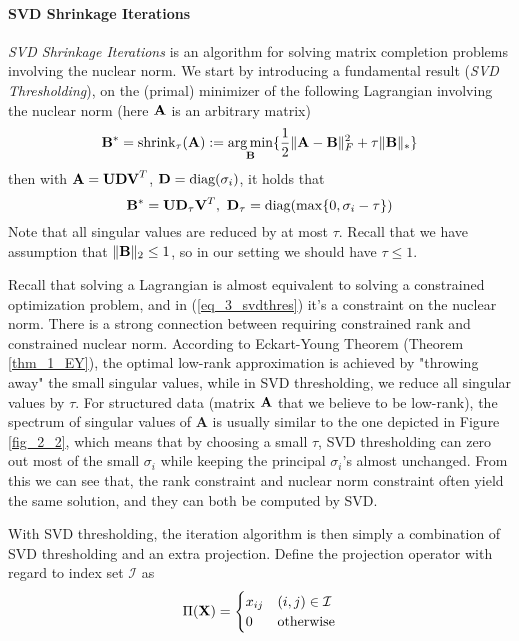 \documentclass[../book-template.tex]{subfiles}
\begin{document}
\paragraph{SVD Shrinkage Iterations}
\par \emph{SVD Shrinkage Iterations} is an algorithm for solving matrix completion problems involving the nuclear norm. We start by introducing a fundamental result (\emph{SVD Thresholding}), on the (primal) minimizer of the following Lagrangian involving the nuclear norm (here ${\bf A}$ is an arbitrary matrix)
\begin{equation}\label{eq_3_svdthres}
	{\bf B}^*=\text{shrink}_{\tau}({\bf A}):=\mathop{\arg\min}_{{\bf B}}\{\frac{1}{2}\|{\bf A}-{\bf B}\|^2_F+\tau\|{\bf B}\|_*\}
\end{equation}
then with ${\bf A}={\bf UDV}^T$, ${\bf D}=\text{diag}(\sigma_i)$, it holds that
\begin{equation*}
	{\bf B}^* = {\bf UD}_{\tau}{\bf V}^T,\ {\bf D}_{\tau}=\text{diag}(\max\{0, \sigma_i-\tau\})
\end{equation*}
Note that all singular values are reduced by at most $\tau$. Recall that we have assumption that $\|{\bf B}\|_2\leq 1$, so in our setting we should have $\tau \leq 1$.
\par Recall that solving a Lagrangian is almost equivalent to solving a constrained optimization problem, and in (\ref{eq_3_svdthres}) it's a constraint on the nuclear norm. There is a strong connection between requiring constrained rank and constrained nuclear norm. According to Eckart-Young Theorem (Theorem \ref{thm_1_EY}), the optimal low-rank approximation is achieved by "throwing away" the small singular values, while in SVD thresholding, we reduce all singular values by $\tau$. For structured data (matrix ${\bf A}$ that we believe to be low-rank), the spectrum of singular values of $\bm{A}$ is usually similar to the one depicted in Figure \ref{fig_2_2}, which means that by choosing a small $\tau$, SVD thresholding can zero out most of the small $\sigma_i$ while keeping the principal $\sigma_i$'s almost unchanged. From this we can see that, the rank constraint and nuclear norm constraint often yield the same solution, and they can both be computed by SVD.
\par With SVD thresholding, the iteration algorithm is then simply a combination of SVD thresholding and an extra projection. Define the projection operator with regard to index set $\mathcal{I}$ as
\begin{equation*}
	\Pi({\bf X})=\begin{cases}
	x_{ij} & (i,j)\in \mathcal{I}\\
	0 & \text{otherwise}
	\end{cases}
\end{equation*} 
\end{document}
